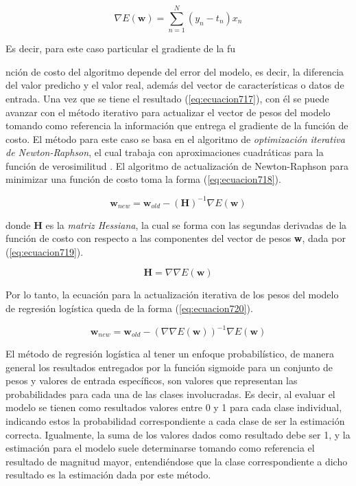 \begin{equation}
	\nabla{E(\textbf{w})}= \sum_{n=1}^{N} {(y_n - t_n) x_n}
	\label{eq:ecuacion717}
\end{equation}

Es decir, para este caso particular el gradiente de la fu{nción de costo del algoritmo depende del error del modelo, es decir, la diferencia del valor predicho y el valor real, además del vector de características o datos 
de entrada. Una vez que se tiene el resultado (\ref{eq:ecuacion717}), con él se puede avanzar con el método iterativo para actualizar el vector de pesos del modelo tomando como referencia la información que entrega el 
gradiente de la función de costo. El método para este caso se basa en el algoritmo de \textit{optimización iterativa de Newton-Raphson}, el cual trabaja con aproximaciones cuadráticas para la función de verosimilitud \cite{bishop}. El 
algoritmo de actualización de Newton-Raphson para minimizar una función de costo toma la forma (\ref{eq:ecuacion718}).

\begin{equation}
	{\textbf{w}}_{new}= {\textbf{w}}_{old} -{(\textbf{H})^{-1}} \nabla{E(\textbf{w})}
	\label{eq:ecuacion718}
\end{equation}

donde \textbf{H} es la \textit{matriz Hessiana}, la cual se forma con las segundas derivadas de la función de costo con respecto a las componentes del vector de pesos \textbf{w}, dada por (\ref{eq:ecuacion719}).

\begin{equation}
	\textbf{H}= \nabla{\nabla{E(\textbf{w})}}
	\label{eq:ecuacion719}
\end{equation}

Por lo tanto, la ecuación para la actualización iterativa de los pesos del modelo de regresión logística queda de la forma (\ref{eq:ecuacion720}).

\begin{equation}
	{\textbf{w}}_{new}= {\textbf{w}}_{old} -{(\nabla{\nabla{E(\textbf{w})}})^{-1}} \nabla{E(\textbf{w})}
	\label{eq:ecuacion720}
\end{equation}

El método de regresión logística al tener un enfoque probabilístico, de manera general los resultados entregados por la función sigmoide para un conjunto de pesos y valores de entrada específicos, son valores que representan 
las probabilidades para cada una de las clases involucradas. Es decir, al evaluar el modelo se tienen como resultados valores entre 0 y 1 para cada clase individual, indicando estos la probabilidad correspondiente a cada 
clase de ser la estimación correcta. Igualmente, la suma de los valores dados como resultado debe ser 1, y la estimación para el modelo suele determinarse tomando como referencia el resultado de magnitud mayor, entendiéndose 
que la clase correspondiente a dicho resultado es la estimación dada por este método.

}
